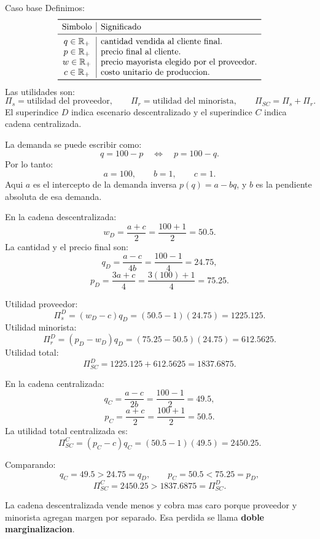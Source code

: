 \begin{solucion}{Caso base}
Definimos:
\[
\begin{array}{c|l}
\toprule
\text{Simbolo} & \text{Significado} \\
\midrule
q\in\mathbb{R}_+ & \text{cantidad vendida al cliente final.}\\
p\in\mathbb{R}_+ & \text{precio final al cliente.}\\
w\in\mathbb{R}_+ & \text{precio mayorista elegido por el proveedor.}\\
c\in\mathbb{R}_+ & \text{costo unitario de produccion.}\\
\bottomrule
\end{array}
\]
Las utilidades son:
\[
\Pi_s=\text{utilidad del proveedor},
\qquad
\Pi_r=\text{utilidad del minorista},
\qquad
\Pi_{SC}=\Pi_s+\Pi_r.
\]
El superindice \(D\) indica escenario descentralizado y el superindice \(C\) indica cadena centralizada.

La demanda se puede escribir como:
\[
q=100-p
\quad\Longleftrightarrow\quad
p=100-q.
\]
Por lo tanto:
\[
a=100,\qquad b=1,\qquad c=1.
\]
Aqui \(a\) es el intercepto de la demanda inversa \(p(q)=a-bq\), y \(b\) es la pendiente absoluta de esa demanda.

En la cadena descentralizada:
\[
w_D=\frac{a+c}{2}
=\frac{100+1}{2}
=50.5.
\]
La cantidad y el precio final son:
\[
q_D=\frac{a-c}{4b}
=\frac{100-1}{4}
=24.75,
\]
\[
p_D=\frac{3a+c}{4}
=\frac{3(100)+1}{4}
=75.25.
\]

Utilidad proveedor:
\[
\Pi_s^D=(w_D-c)q_D
=(50.5-1)(24.75)
=1225.125.
\]
Utilidad minorista:
\[
\Pi_r^D=(p_D-w_D)q_D
=(75.25-50.5)(24.75)
=612.5625.
\]
Utilidad total:
\[
\Pi_{SC}^D=1225.125+612.5625
=1837.6875.
\]

En la cadena centralizada:
\[
q_C=\frac{a-c}{2b}
=\frac{100-1}{2}
=49.5,
\]
\[
p_C=\frac{a+c}{2}
=\frac{100+1}{2}
=50.5.
\]
La utilidad total centralizada es:
\[
\Pi_{SC}^C=(p_C-c)q_C
=(50.5-1)(49.5)
=2450.25.
\]

Comparando:
\[
q_C=49.5>24.75=q_D,
\qquad
p_C=50.5<75.25=p_D,
\]
\[
\Pi_{SC}^C=2450.25>1837.6875=\Pi_{SC}^D.
\]

La cadena descentralizada vende menos y cobra mas caro porque proveedor y minorista agregan margen por separado. Esa perdida se llama \textbf{doble marginalizacion}.
\end{solucion}
